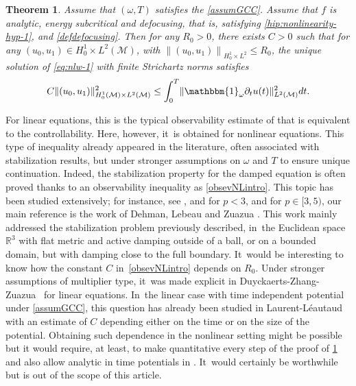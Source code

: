 \documentclass[10pt]{amsart}
\newtheorem{theorem}{Theorem}[section]
\theoremstyle{definition}
\let\mc\mathcal
\newcommand{\M}{\mc{M}}
\newcommand{\R}{\mathbb{R}}
\providecommand{\norm}[1]{\lVert#1\rVert}
\newcommand\nor[2]{\left\|#1\right\|_{#2}}
\begin{document}
\begin{theorem}
\label{thmobserintro}
Assume that $(\omega, T)$ satisfies the \ref{assumGCC}. Assume that $f$ is analytic, energy subcritical and defocusing, that is, satisfying \eqref{hip:nonlinearity-hyp-1}, and \eqref{defdefocusing}. Then for any $R_0\!>\!0$, there exists $C\!>\!0$ such that for any $(u_0,u_1)\!\in\! H^1_0\!\times\! L^2(\M)$, with $\nor{(u_0,u_1)}{H^1_0\times L^2}\leq R_0$, the unique solution of \eqref{eq:nlw-1} with finite Strichartz norms satisfies
\begin{align}\label{obsevNLintro}
C\norm{(u_0, u_1)}_{H_0^1(\M)\times L^2(\M)}^2\leq \int_0^T \norm{\mathbbm{1}_\omega\partial_t u(t)}_{L^2(\M)}^2 dt.
\end{align}
\end{theorem}
For linear equations, this is the typical observability estimate of \cite{BLR92} that is equivalent to the controllability. Here, however, it~is obtained for nonlinear equations. This type of inequality already appeared in the literature, often associated with stabilization results, but under stronger assumptions on $\omega$ and $T$ to ensure unique continuation. Indeed, the stabilization property for the damped equation is often proved thanks to an observability inequality as \eqref{obsevNLintro}. This topic has been studied extensively; for instance, see \cite{H:85}, \cite{Z:91} and \cite{D:01} for $p<3$, and for $p\in[3,5)$, our main reference is the work of Dehman, Lebeau and Zuazua \cite{DLZ03}. This work mainly addressed the stabilization problem previously described, in~the Euclidean space $\R^3$ with flat metric and active damping outside of a ball, or on a bounded domain, but with damping close to the full boundary. It~would be interesting to know how the constant $C$ in~\eqref{obsevNLintro} depends on $R_0$. Under stronger assumptions of multiplier type, it~was made explicit in Duyckaerts-Zhang-Zuazua~\cite{DZZ:08} for linear equations. In~the linear case with time independent potential under \ref{assumGCC}, this question has already been studied in Laurent-Léautaud~\cite{LL16} with an estimate of $C$ depending either on the time or on the size of the potential. Obtaining such dependence in the nonlinear setting might be possible but it would require, at least, to make quantitative every step of the proof of \cref{thmobserintro} and also allow analytic in time potentials in \cite{LL16}. It~would certainly be worthwhile but is out of the scope of this article.
\end{document}
